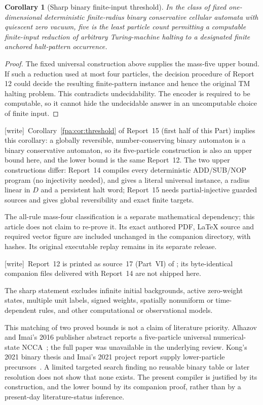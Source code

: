 \documentclass[11pt,a4paper]{article}
\numberwithin{equation}{section}
\newtheorem{corollary}[theorem]{Corollary}
\newcommand{\wtag}{\textup{[write]}}
\begin{document}
\begin{corollary}[Sharp binary finite-input threshold]\label{fpa:bc:cor:sharp}
In the class of fixed one-dimensional deterministic finite-radius binary
conservative cellular automata with quiescent zero vacuum, five is the least
particle count permitting a computable finite-input reduction of arbitrary
Turing-machine halting to a designated finite anchored halt-pattern occurrence.
\end{corollary}
\begin{proof}
The fixed universal construction above supplies the mass-five upper bound.
If such a reduction used at most four particles, the decision procedure of
Report 12 could decide the resulting finite-pattern instance and hence the
original TM halting problem. This contradicts undecidability. The encoder is
required to be computable, so it cannot hide the undecidable answer in an
uncomputable choice of finite input.
\end{proof}

\wtag\ Corollary~\ref{fpa:cor:threshold} of Report~15 (first half of this Part) implies this corollary: a globally reversible, number-conserving binary automaton is a binary conservative automaton, so its five-particle construction is also an upper bound here, and the lower bound is the same Report~12. The two upper constructions differ: Report~14 compiles every deterministic ADD/SUB/NOP program (no injectivity needed), and gives a literal universal instance, a radius linear in $D$ and a persistent halt word; Report~15 needs partial-injective guarded sources and gives global reversibility and exact finite targets.

The all-rule mass-four classification is a separate mathematical dependency;
this article does not claim to re-prove it. Its exact authored PDF, LaTeX source
and required vector figure are included unchanged in the companion directory,
with hashes. Its original executable replay remains in its separate release.

\wtag\ Report~12 is printed as source~17 (Part~VI) of ; its byte-identical companion files delivered with Report~14 are not shipped here.

The sharp statement excludes infinite initial backgrounds, active zero-weight
states, multiple unit labels, signed weights, spatially nonuniform or
 time-dependent rules, and other computational or observational models.

This matching of two proved bounds is not a claim of literature priority.
Alhazov and Imai's 2016 publisher abstract reports a five-particle universal
numerical-state NCCA~\cite{fpa:alhazovimai}; the full paper was unavailable in the
underlying review. Kong's 2021 binary thesis and Imai's 2021 project report
supply lower-particle precursors~\cite{fpa:kong,fpa:imai}. A limited targeted search
finding no reusable binary table or later resolution does not show that none
exists. The present compiler is justified by its construction, and the lower
bound by its companion proof, rather than by a present-day literature-status
inference.
\end{document}
